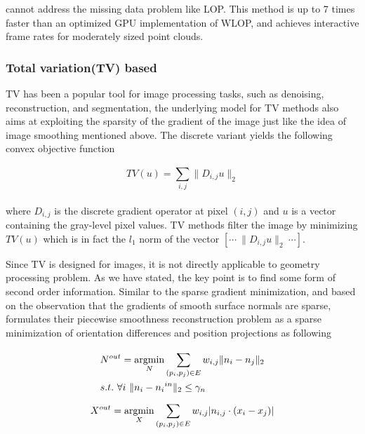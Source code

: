 cannot address the missing data problem like LOP. This method is up to 7 times faster than an optimized GPU implementation of WLOP, and achieves interactive frame rates for moderately sized point clouds.

\subsubsection{Total variation(TV) based}
TV has been a popular tool for image processing tasks, such as denoising, reconstruction, and segmentation\cite{chambolle2010introduction}, the underlying model for TV methods also aims at exploiting the sparsity of the gradient of the image just like the idea of image smoothing\cite{xu2011image} mentioned above. The discrete variant yields the following convex objective function

\small{
\begin{equation}
 \label{eq:TV}
 TV(u)=\sum_{i,j}^{}\|D_{i,j}u\|_2
\end{equation}
}
\\
where $D_{i,j}$ is the discrete gradient operator at pixel $(i,j)$ and $u$ is a vector containing the gray-level pixel values. TV methods filter the image by minimizing $TV(u)$ which is in fact the $l_1$ norm of the vector $[\cdots~\|D_{i,j}u\|_2~\cdots]$.

Since TV is designed for images, it is not directly applicable to geometry processing problem. As we have stated, the key point is to find some form of second order information. Similar to the sparse gradient minimization, and based on the observation that the gradients of smooth surface normals are sparse, \cite{avron2010L1} formulates their piecewise smoothness reconstruction problem as a sparse minimization of orientation differences and position projections as following

\small{
\begin{equation}
 \label{eq:L1reconstruction}
 \begin{aligned}
 &N^{out} =\mathop{\argmin}_{N} \sum_{(p_{i},p_{j})\in E}^{} w_{i,j}\|n_{i}-n_{j}\|_2\\
 &s.t.~\forall i~\|n_{i}-{n_{i}}^{in}\|_2\le \gamma_{n} %
 \end{aligned}
\end{equation}
}
\small{
\begin{equation}
 \label{eq:L1reconstruction}
 X^{out} = \mathop{\operatorname*{argmin}}_{X} \sum_{(p_{i},p_{j})\in E}^{} w_{i,j}|n_{i,j}\cdot (x_{i}-x_{j})|
\end{equation}
}

